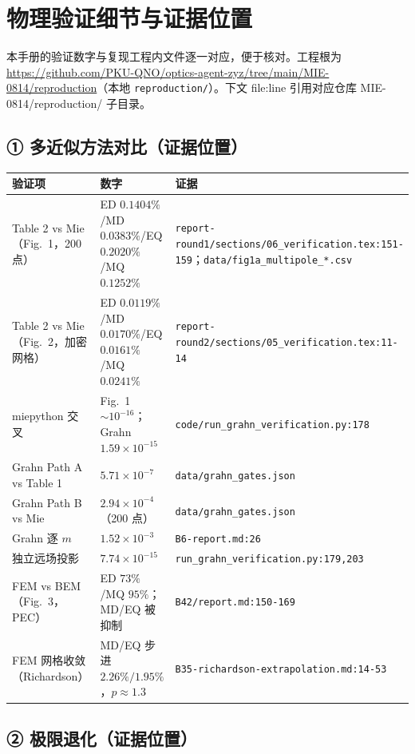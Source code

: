 \section{物理验证细节与证据位置}

本手册的验证数字与复现工程内文件逐一对应，便于核对。工程根为 \url{https://github.com/PKU-QNO/optics-agent-zyz/tree/main/MIE-0814/reproduction}（本地 \texttt{reproduction/}）。下文 file:line 引用对应仓库 MIE-0814/reproduction/ 子目录。

\subsection{① 多近似方法对比（证据位置）}

\begin{longtable}{p{4.8cm}p{5.4cm}p{3.6cm}}
\toprule
验证项 & 数字 & 证据 \\
\midrule
\endhead
Table 2 vs Mie（Fig.~1，200 点） & ED $0.1404\%$/MD $0.0383\%$/EQ $0.2020\%$/MQ $0.1252\%$ & \texttt{report-round1/sections/06\_verification.tex:151-159}；\texttt{data/fig1a\_multipole\_*.csv} \\
Table 2 vs Mie（Fig.~2，加密网格） & ED $0.0119\%$/MD $0.0170\%$/EQ $0.0161\%$/MQ $0.0241\%$ & \texttt{report-round2/sections/05\_verification.tex:11-14} \\
miepython 交叉 & Fig.~1 $\sim10^{-16}$；Grahn $1.59\times10^{-15}$ & \texttt{code/run\_grahn\_verification.py:178} \\
Grahn Path A vs Table 1 & $5.71\times10^{-7}$ & \texttt{data/grahn\_gates.json} \\
Grahn Path B vs Mie & $2.94\times10^{-4}$（200 点） & \texttt{data/grahn\_gates.json} \\
Grahn 逐 $m$ & $1.52\times10^{-3}$ & \texttt{B6-report.md:26} \\
独立远场投影 & $7.74\times10^{-15}$ & \texttt{run\_grahn\_verification.py:179,203} \\
FEM vs BEM（Fig.~3，PEC） & ED $73\%$/MQ $95\%$；MD/EQ 被抑制 & \texttt{B42/report.md:150-169} \\
FEM 网格收敛（Richardson） & MD/EQ 步进 $2.26\%/1.95\%$，$p\approx1.3$ & \texttt{B35-richardson-extrapolation.md:14-53} \\
\bottomrule
\end{longtable}

\subsection{② 极限退化（证据位置）}

